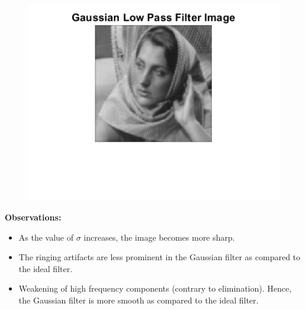 \documentclass{article}
\begin{document}
\begin{figure}[!htb]
\begin{minipage}[b]{0.3\textwidth}
    \end{minipage}
    \begin{minipage}[b]{0.3\textwidth}
        \includegraphics[width=\textwidth]{Gaussian_Filtered_Image_80.png}
    \end{minipage}
\end{figure}

\textbf{Observations:}
\begin{itemize}[noitemsep]
    \item As the value of $\sigma$ increases, the image becomes more sharp.
    \item The ringing artifacts are less prominent in the Gaussian filter as compared to the ideal filter.
    \item Weakening of high frequency components (contrary to elimination). Hence, the Gaussian filter is more smooth as compared to the ideal filter.
\end{itemize}
\end{document}
